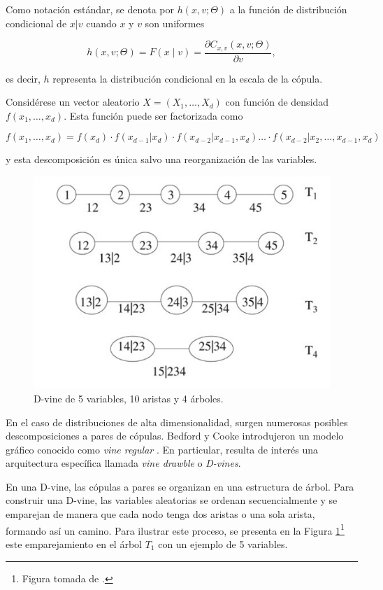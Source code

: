 Como notación estándar, se denota por $h(x, v; \Theta)$ a la función de distribución condicional de $x|v$ cuando $x$ y $v$ son uniformes

\vspace{-0.5cm}
\begin{equation}\label{funH}
    h(x, v; \Theta) = F(x \mid v)=\frac{\partial C_{x, v}(x, v; \Theta)}{\partial v},
\end{equation}

es decir, $h$ representa la distribución condicional en la escala de la cópula.

Considérese un vector aleatorio $X = (X_1, \dots, X_d)$ con función de densidad $f(x_1, \dots, x_d)$. Esta función puede ser factorizada como

\vspace{-0.5cm}
\begin{equation}\label{fact1}
    f(x_1, \dots, x_d) = f(x_d) \cdot f(x_{d-1}|x_d) \cdot f(x_{d-2} | x_{d-1}, x_{d}) \dots \cdot  f(x_{d-2} | x_{2}, \dots, x_{d-1}, x_{d})
\end{equation}

 y esta descomposición es única salvo una reorganización de las variables.

\begin{figure}[H]
    \centering
    \includegraphics[width = 0.6 \textwidth]{Imagenes/Dvine5var.png}
    \caption{D-vine de 5 variables, 10 aristas y 4 árboles.}
    \label{fig:Dvine5}
\end{figure}

En el caso de distribuciones de alta dimensionalidad, surgen numerosas posibles descomposiciones a pares de cópulas. Bedford y Cooke  introdujeron un modelo gráfico conocido como \textit{vine regular} \cite{Bedford2001}. En particular, resulta de interés una arquitectura específica llamada \textit{vine drawble} o \textit{D-vines}.


En una D-vine, las cópulas a pares se organizan en una estructura de árbol. Para construir una D-vine, las variables aleatorias se ordenan secuencialmente y se emparejan de manera que cada nodo tenga dos aristas o una sola arista, formando así un camino. Para ilustrar este proceso, se presenta en la Figura \ref{fig:Dvine5}\footnote{Figura tomada de \cite{PairCopula}.} este emparejamiento en el árbol $T_1$ con un ejemplo de 5 variables.



